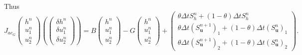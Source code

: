 \documentclass[a4paper, 11pt]{article}
\begin{document}
Thus
\begin{equation*}
J_{ac_G}\begin{pmatrix}h^n\\u_1^n\\u_2^n\end{pmatrix}\left(\begin{pmatrix}\delta h^n\\\delta u_1^n\\\delta u_2^n\end{pmatrix}\right)=B\begin{pmatrix}h^n\\u_1^n\\u_2^n\end{pmatrix}-G\begin{pmatrix}h^{n}\\u_1^{n}\\u_2^{n}\end{pmatrix}+\begin{pmatrix}\theta \Delta tS_h^n+(1-\theta)\Delta tS_h^{n}\\ \theta \Delta t\left(S_{\boldsymbol{u}}^{n+1}\right)_1+(1-\theta)\Delta t\left(S_{\boldsymbol{u}}^n\right)_1\\ \theta \Delta t\left(S_{\boldsymbol{u}}^{n+1}\right)_2+(1-\theta)\Delta t\left(S_{\boldsymbol{u}}^n\right)_2\end{pmatrix}.
\end{equation*}
\end{document}
